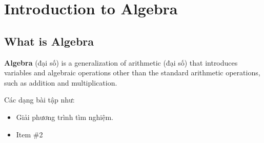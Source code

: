 \chapter{Introduction to Algebra}

\section{What is Algebra}

\textbf{Algebra} (đại số) is a generalization of arithmetic (đại số) that introduces variables and algebraic operations other than the standard arithmetic operations, such as addition and multiplication.

Các dạng bài tập như:
\begin{itemize}
  \item Giải phương trình tìm nghiệm.
  \item Item \#2
\end{itemize}